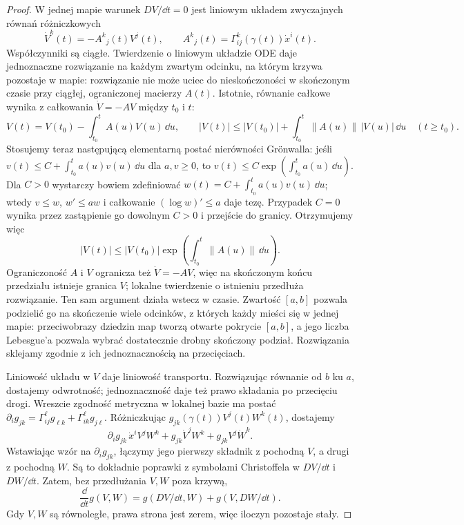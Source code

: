\begin{proof}
W jednej mapie warunek $DV/\dd t=0$
jest liniowym układem zwyczajnych równań
różniczkowych
\begin{equation}\label{eq:ode-transport}
 \dot V^k(t)=-A^k{}_j(t)V^j(t),\qquad
 A^k{}_j(t)=\Gamma^k_{ij}(\gamma(t))\dot x^i(t).
\end{equation}
Współczynniki są ciągłe. Twierdzenie o liniowym
układzie ODE daje jednoznaczne rozwiązanie na
każdym zwartym odcinku, na którym krzywa
pozostaje w mapie: rozwiązanie nie może uciec
do nieskończoności w skończonym czasie przy
ciągłej, ograniczonej macierzy $A(t)$. Istotnie, równanie
całkowe wynika z całkowania $\dot V=-AV$
między $t_0$ i $t$:
\[
 V(t)=V(t_0)-\int_{t_0}^t A(u)V(u)\,\dd u,\qquad
 |V(t)|\leq|V(t_0)|
       +\int_{t_0}^t\|A(u)\|\,|V(u)|\,\dd u
 \quad(t\geq t_0).
\]
Stosujemy teraz następującą elementarną postać nierówności Grönwalla:
jeśli $v(t)\leq C+\int_{t_0}^t a(u)v(u)\,\dd u$
dla $a,v\geq0$, to $v(t)\leq C\exp(\int_{t_0}^t a(u)\,\dd u)$.
Dla $C>0$ wystarczy bowiem zdefiniować
$w(t)=C+\int_{t_0}^t a(u)v(u)\,\dd u$;
wtedy $v\leq w$, $w'\leq aw$ i całkowanie
$(\log w)'\leq a$ daje tezę.
Przypadek $C=0$ wynika przez zastąpienie go dowolnym
$C>0$ i przejście do granicy. Otrzymujemy więc
\[
 |V(t)|\le |V(t_0)|
       \exp\!\left(\int_{t_0}^t\|A(u)\|\,\dd u\right).
\]
Ograniczoność $A$ i $V$ ogranicza też $\dot V=-AV$,
więc na skończonym końcu przedziału istnieje granica $V$;
lokalne twierdzenie o istnieniu przedłuża rozwiązanie.
Ten sam argument działa wstecz w czasie.
Zwartość $[a,b]$ pozwala podzielić go na
skończenie wiele odcinków, z których każdy
mieści się w jednej mapie: przeciwobrazy dziedzin map
tworzą otwarte pokrycie $[a,b]$, a jego liczba Lebesgue'a
pozwala wybrać dostatecznie drobny skończony podział.
Rozwiązania sklejamy
zgodnie z ich jednoznacznością na przecięciach.

Liniowość układu w $V$ daje liniowość transportu.
Rozwiązując równanie od $b$ ku $a$, dostajemy
odwrotność; jednoznaczność daje też prawo
składania po przecięciu drogi. Wreszcie
zgodność metryczna w lokalnej bazie ma postać
$\partial_i g_{jk}=\Gamma^\ell_{ij}g_{\ell k}
+\Gamma^\ell_{ik}g_{j\ell}$. Różniczkując
$g_{jk}(\gamma(t))V^j(t)W^k(t)$, dostajemy
\[
 \partial_i g_{jk}\,\dot x^i V^jW^k
   +g_{jk}\dot V^jW^k+g_{jk}V^j\dot W^k.
\]
Wstawiając wzór na $\partial_i g_{jk}$, łączymy
jego pierwszy składnik z pochodną $V$, a drugi z pochodną $W$.
Są to dokładnie poprawki z symbolami Christoffela
w $DV/\dd t$ i $DW/\dd t$. Zatem, bez przedłużania
$V,W$ poza krzywą,
\[
 \frac{\dd}{\dd t}g(V,W)
 =g(DV/\dd t,W)+g(V,DW/\dd t).
\]
Gdy $V,W$ są równoległe, prawa strona jest
zerem, więc iloczyn pozostaje stały.
\end{proof}

